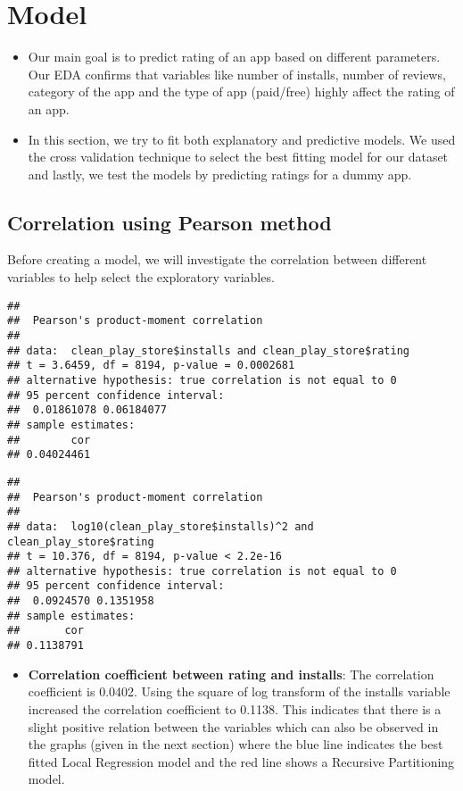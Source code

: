 \documentclass[
]{article}
\providecommand{\tightlist}{%
  \setlength{\itemsep}{0pt}\setlength{\parskip}{0pt}}
\begin{document}
\hypertarget{model}{%
\section{Model}\label{model}}

\begin{itemize}
\item
  Our main goal is to predict rating of an app based on different
  parameters. Our EDA confirms that variables like number of installs,
  number of reviews, category of the app and the type of app (paid/free)
  highly affect the rating of an app.
\item
  In this section, we try to fit both explanatory and predictive models.
  We used the cross validation technique to select the best fitting
  model for our dataset and lastly, we test the models by predicting
  ratings for a dummy app.
\end{itemize}

\hypertarget{correlation-using-pearson-method}{%
\subsection{Correlation using Pearson
method}\label{correlation-using-pearson-method}}

Before creating a model, we will investigate the correlation between
different variables to help select the exploratory variables.

\begin{verbatim}
## 
##  Pearson's product-moment correlation
## 
## data:  clean_play_store$installs and clean_play_store$rating
## t = 3.6459, df = 8194, p-value = 0.0002681
## alternative hypothesis: true correlation is not equal to 0
## 95 percent confidence interval:
##  0.01861078 0.06184077
## sample estimates:
##        cor 
## 0.04024461
\end{verbatim}

\begin{verbatim}
## 
##  Pearson's product-moment correlation
## 
## data:  log10(clean_play_store$installs)^2 and clean_play_store$rating
## t = 10.376, df = 8194, p-value < 2.2e-16
## alternative hypothesis: true correlation is not equal to 0
## 95 percent confidence interval:
##  0.0924570 0.1351958
## sample estimates:
##       cor 
## 0.1138791
\end{verbatim}

\begin{itemize}
\tightlist
\item
  \textbf{Correlation coefficient between rating and installs}: The
  correlation coefficient is 0.0402. Using the square of log transform
  of the installs variable increased the correlation coefficient to
  0.1138. This indicates that there is a slight positive relation
  between the variables which can also be observed in the graphs (given
  in the next section) where the blue line indicates the best fitted
  Local Regression model and the red line shows a Recursive Partitioning
  model.
\end{itemize}
\end{document}
